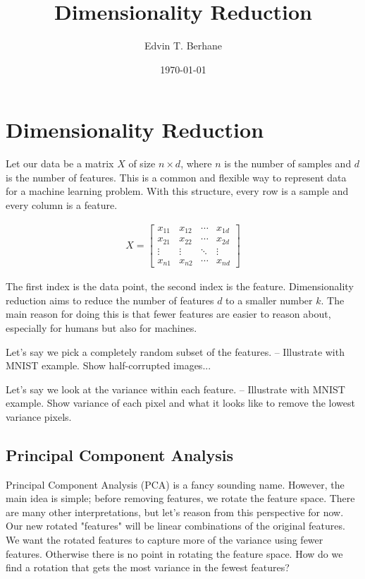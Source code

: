\documentclass[12pt]{article}  %
\title{Dimensionality Reduction}
\author{Edvin T. Berhane}
\date{\today}
\begin{document}
\section*{Dimensionality Reduction}

Let our data be a matrix $X$ of size $n \times d$, where $n$ is the number of samples and $d$ is the number of features. This is a common and flexible way to represent data for a machine learning problem. With this structure, every row is a sample and every column is a feature.

\begin{align*}
    X = \begin{bmatrix}
        x_{11} & x_{12} & \cdots & x_{1d} \\
        x_{21} & x_{22} & \cdots & x_{2d} \\
        \vdots & \vdots & \ddots & \vdots \\
        x_{n1} & x_{n2} & \cdots & x_{nd}
    \end{bmatrix}
\end{align*}

The first index is the data point, the second index is the feature. Dimensionality reduction aims to reduce the number of features $d$ to a smaller number $k$. The main reason for doing this is that fewer features are easier to reason about, especially for humans but also for machines.

Let's say we pick a completely random subset of the features. 
-- Illustrate with MNIST example. Show half-corrupted images...

Let's say we look at the variance within each feature.
-- Illustrate with MNIST example. Show variance of each pixel and what it looks like to remove the lowest variance pixels.

\subsection*{Principal Component Analysis}

Principal Component Analysis (PCA) is a fancy sounding name. However, the main idea is simple; before removing features, we rotate the feature space. There are many other interpretations, but let's reason from this perspective for now. Our new rotated "features" will be linear combinations of the original features. We want the rotated features to capture more of the variance using fewer features. Otherwise there is no point in rotating the feature space. How do we find a rotation that gets the most variance in the fewest features?
\end{document}
